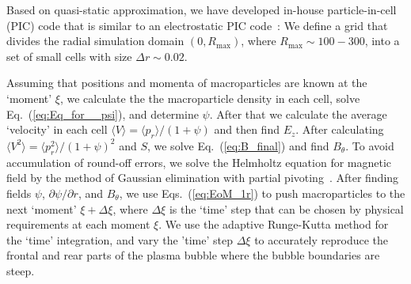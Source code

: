 \documentclass[twocolumn,showpacs,aip]{revtex4}
\begin{document}
Based on  quasi-static approximation, we have developed in-house particle-in-cell (PIC) code  that is  similar to an electrostatic PIC code~\cite{Birdsall_book}: We define a grid that divides the  radial simulation domain $(0, R_{\max})$, where $R_{\max}\sim 100-300$,  into a set of small cells with size $\Delta r\sim 0.02$. 

Assuming that positions and momenta of macroparticles are known at the `moment' $\xi$, we calculate the the macroparticle density in each cell, solve Eq.~(\ref{eq:Eq_for__psi}), and determine $\psi$. 
After that we calculate the average `velocity' in each cell $\langle V\rangle=\langle p_r\rangle/(1+\psi)$ and then find $E_z$.
After calculating  $\langle V^2\rangle=\langle p_r^2\rangle/(1+\psi)^2$ and   $S$, we solve Eq.~(\ref{eq:B_final}) and find $B_{\theta}$. To avoid accumulation of round-off errors, we solve the Helmholtz equation for magnetic field by the method of Gaussian elimination   with partial pivoting~\cite{burden_numerical_2015}. After finding fields $\psi$, $\partial\psi/\partial r$, and $B_{\theta}$, we use Eqs.~(\ref{eq:EoM_1r}) to push macroparticles  to the next `moment' $\xi+\Delta \xi$, where  $\Delta\xi$ is the `time' step that  can be chosen by physical requirements at each moment $\xi$.   We use the adaptive Runge-Kutta method  for the `time' integration, and vary the 'time' step $\Delta\xi$   to accurately reproduce the frontal and rear parts of the plasma bubble where the bubble boundaries  are steep.
\end{document}
